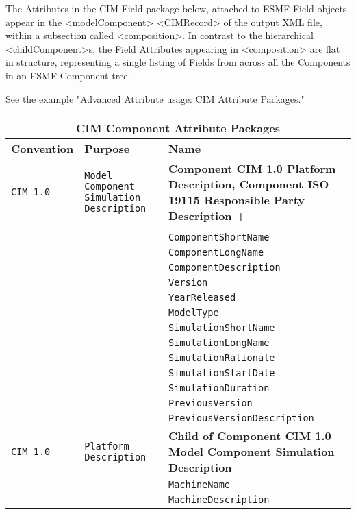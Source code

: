 The Attributes in the CIM Field package below, attached to ESMF Field objects, appear in the <modelComponent> <CIMRecord> of the output XML file, within a subsection called <composition>.  In contrast to the hierarchical <childComponent>s, the Field Attributes appearing in <composition> are flat in structure, representing a single listing of Fields from across all the Components in an ESMF Component tree.

See the example "Advanced Attribute usage: CIM Attribute Packages."

\vspace{8pt}

\label{CIMComponentAttributePackages}
\begin{tabular}{|p{4cm}|p{4cm}|p{8cm}|}
\hline
\multicolumn{3}{|c|}{{\bf \large CIM Component Attribute Packages}} \\
\hline\hline
{\bf Convention} & {\bf Purpose} & {\bf Name} \\
\hline\hline
{\tt CIM 1.0} & {\tt Model Component Simulation Description} & {\bf Component CIM 1.0 Platform Description, \newline\newline \bf Component ISO 19115 Responsible Party Description +} \\
     & & \\
     & & {\tt ComponentShortName} \\
     & & {\tt ComponentLongName} \\
     & & {\tt ComponentDescription}  \\
     & & {\tt Version}  \\
     & & {\tt YearReleased} \\
     & & {\tt ModelType} \\
     & & {\tt SimulationShortName}\\
     & & {\tt SimulationLongName} \\ 
     & & {\tt SimulationRationale} \\
     & & {\tt SimulationStartDate} \\ 
     & & {\tt SimulationDuration} \\ 
     & & {\tt PreviousVersion} \\ 
     & & {\tt PreviousVersionDescription} \\ 
\hline
{\tt CIM 1.0} & {\tt Platform Description} & {\bf Child of Component CIM 1.0 Model Component Simulation Description}\\
     & & {\tt MachineName} \\
     & & {\tt MachineDescription} \\

\end{tabular}
